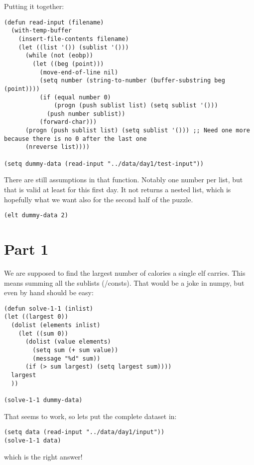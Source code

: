 \documentclass[11pt]{article}
\begin{document}
Putting it together:

\begin{verbatim}
(defun read-input (filename)
  (with-temp-buffer
    (insert-file-contents filename)
    (let ((list '()) (sublist '()))
      (while (not (eobp))
        (let ((beg (point)))
          (move-end-of-line nil)
          (setq number (string-to-number (buffer-substring beg (point))))
          (if (equal number 0)
              (progn (push sublist list) (setq sublist '()))
            (push number sublist))
          (forward-char)))
      (progn (push sublist list) (setq sublist '())) ;; Need one more because there is no 0 after the last one
      (nreverse list))))

(setq dummy-data (read-input "../data/day1/test-input"))
\end{verbatim}

There are still assumptions in that function.
Notably one number per list, but that is valid at least for this first day.
It not returns a nested list, which is hopefully what we want also for the second half of the puzzle.

\begin{verbatim}
(elt dummy-data 2)
\end{verbatim}

\section{Part 1}
\label{sec:orge0aa6b8}
We are supposed to find the largest number of calories a single elf carries.
This means summing all the sublists (/consts).
That would be a joke in numpy, but even by hand should be easy:

\begin{verbatim}
(defun solve-1-1 (inlist)
(let ((largest 0))
  (dolist (elements inlist)
    (let ((sum 0))
      (dolist (value elements)
        (setq sum (+ sum value))
        (message "%d" sum))
      (if (> sum largest) (setq largest sum))))
  largest
  ))

(solve-1-1 dummy-data)
\end{verbatim}

That seems to work, so lets put the complete dataset in:

\begin{verbatim}
(setq data (read-input "../data/day1/input"))
(solve-1-1 data)
\end{verbatim}

which is the right answer!
\end{document}
